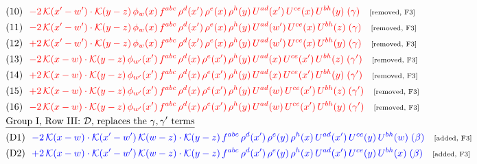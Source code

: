 \documentclass[9pt]{article}
\begin{document}
\begin{align}
&\quad\text{(10)}\ \ \textcolor{red}{-2\,\mathcal{K}(x'-w')\cdot \mathcal{K}(y-z)\, \mathcal{\phi}_{w}(x)\, f^{abc}\, \rho^{d}(x')\,\rho^{e}(x)\,\rho^{h}(y)\, U^{ad}(x')\, U^{ce}(x)\, U^{bh}(y)\;(\gamma)}\quad\text{\scriptsize[removed, F3]}\notag\\
&\quad\text{(11)}\ \ \textcolor{red}{-2\,\mathcal{K}(x'-w')\cdot \mathcal{K}(y-z)\, \mathcal{\phi}_{w}(x)\, f^{abc}\, \rho^{d}(x')\,\rho^{e}(x)\,\rho^{h}(y)\, U^{ad}(w')\, U^{ce}(x)\, U^{bh}(z)\;(\gamma)}\quad\text{\scriptsize[removed, F3]}\notag\\
&\quad\text{(12)}\ \ \textcolor{red}{+ 2\,\mathcal{K}(x'-w')\cdot \mathcal{K}(y-z)\, \mathcal{\phi}_{w}(x)\, f^{abc}\, \rho^{d}(x')\,\rho^{e}(x)\,\rho^{h}(y)\, U^{ad}(w')\, U^{ce}(x)\, U^{bh}(y)\;(\gamma)}\quad\text{\scriptsize[removed, F3]}\notag\\
&\quad\text{(13)}\ \ \textcolor{red}{-2\,\mathcal{K}(x-w)\cdot \mathcal{K}(y-z)\, \mathcal{\phi}_{w'}(x')\, f^{abc}\, \rho^{d}(x)\,\rho^{e}(x')\,\rho^{h}(y)\, U^{ad}(x)\, U^{ce}(x')\, U^{bh}(z)\;(\gamma')}\quad\text{\scriptsize[removed, F3]}\notag\\
&\quad\text{(14)}\ \ \textcolor{red}{+2\,\mathcal{K}(x-w)\cdot \mathcal{K}(y-z)\, \mathcal{\phi}_{w'}(x')\, f^{abc}\, \rho^{d}(x)\,\rho^{e}(x')\,\rho^{h}(y)\, U^{ad}(x)\, U^{ce}(x')\, U^{bh}(y)\;(\gamma')}\quad\text{\scriptsize[removed, F3]}\notag\\
&\quad\text{(15)}\ \ \textcolor{red}{+2\,\mathcal{K}(x-w)\cdot \mathcal{K}(y-z)\, \mathcal{\phi}_{w'}(x')\, f^{abc}\, \rho^{d}(x)\,\rho^{e}(x')\,\rho^{h}(y)\, U^{ad}(w)\, U^{ce}(x')\, U^{bh}(z)\;(\gamma')}\quad\text{\scriptsize[removed, F3]}\notag\\
&\quad\text{(16)}\ \ \textcolor{red}{-2\,\mathcal{K}(x-w)\cdot \mathcal{K}(y-z)\, \mathcal{\phi}_{w'}(x')\, f^{abc}\, \rho^{d}(x)\,\rho^{e}(x')\,\rho^{h}(y)\, U^{ad}(w)\, U^{ce}(x')\, U^{bh}(y)\;(\gamma')}\quad\text{\scriptsize[removed, F3]}\notag\\
&\quad\underline{\text{Group I, Row III: $\mathcal D$, replaces the $\gamma,\gamma'$ terms}}\notag\\
&\quad\text{(D1)}\ \ \textcolor{blue}{-2\,\mathcal{K}(x-w)\cdot\mathcal{K}(x'-w')\,\mathcal{K}(w-z)\cdot\mathcal{K}(y-z)\, f^{abc}\,\rho^{d}(x')\,\rho^{e}(y)\,\rho^{h}(x)\,U^{ad}(x')\,U^{ce}(y)\,U^{bh}(w)\;(\beta)}\quad\text{\scriptsize[added, F3]}\notag\\
&\quad\text{(D2)}\ \ \textcolor{blue}{+2\,\mathcal{K}(x-w)\cdot\mathcal{K}(x'-w')\,\mathcal{K}(w-z)\cdot\mathcal{K}(y-z)\, f^{abc}\,\rho^{d}(x')\,\rho^{e}(y)\,\rho^{h}(x)\,U^{ad}(x')\,U^{ce}(y)\,U^{bh}(x)\;(\beta)}\quad\text{\scriptsize[added, F3]}\notag\\

\end{align}
\end{document}
